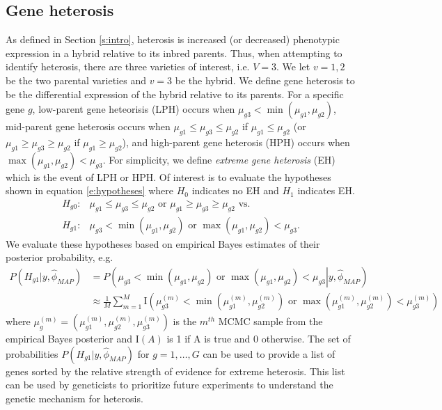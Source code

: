 \documentclass[useAMS,usenatbib,referee]{biom}
\begin{document}
\subsection{Gene heterosis}
\label{s:gene_heterosis}

As defined in Section \ref{s:intro}, heterosis is increased (or decreased) phenotypic expression in a hybrid relative to its inbred parents. Thus, when attempting to identify heterosis, there are three varieties of interest, i.e. $V=3$. We let $v=1,2$ be the two parental varieties and $v=3$ be the hybrid. We define gene heterosis to be the differential expression of the hybrid relative to its parents. For a specific gene $g$, low-parent gene heteorisis (LPH) occurs when $\mu_{g3}< \min(\mu_{g1},\mu_{g2})$, mid-parent gene heterosis occurs when $\mu_{g1}\le \mu_{g3}\le \mu_{g2}$ if $\mu_{g1}\le \mu_{g2}$ (or $\mu_{g1}\ge \mu_{g3}\ge \mu_{g2}$ if $\mu_{g1}\ge \mu_{g2}$), and high-parent gene heterosis (HPH) occurs when $\max(\mu_{g1},\mu_{g2}) < \mu_{g3}$. For simplicity, we define \emph{extreme gene heterosis} (EH) which is the event of LPH or HPH. Of interest is to evaluate the hypotheses shown in equation \eqref{e:hypotheses} where $H_0$ indicates no EH and $H_1$ indicates EH. 
\begin{align}
\label{e:hypotheses}
H_{g0}:&\mu_{g1}\le \mu_{g3}\le \mu_{g2} \mbox{ or } \mu_{g1}\ge \mu_{g3}\ge \mu_{g2} \mbox{\ \ vs.\ \ } \nonumber \\
H_{g1}:&\mu_{g3}< \min(\mu_{g1},\mu_{g2}) \mbox{ or } \max(\mu_{g1},\mu_{g2}) < \mu_{g3}.
\end{align}
We evaluate these hypotheses based on empirical Bayes estimates of their posterior probability, e.g. 
\begin{align}
P\left(H_{g1}|y, \hat{\phi}_{MAP}\right) &= P\left(\left.\mu_{g3}< \min(\mu_{g1},\mu_{g2}) \mbox{ or } \max(\mu_{g1},\mu_{g2}) < \mu_{g3}\right| y, \hat{\phi}_{MAP}\right) \nonumber \\
&\approx \frac{1}{M} \sum_{m=1}^M \mathrm{I}\left(\mu_{g3}^{(m)}< \min\left(\mu_{g1}^{(m)},\mu_{g2}^{(m)}\right) \mbox{ or } \max\left(\mu_{g1}^{(m)},\mu_{g2}^{(m)}\right) < \mu_{g3}^{(m)}\right) \label{e:probs}
\end{align}
where $\mu_g^{(m)} = \left(\mu_{g1}^{(m)},\mu_{g2}^{(m)},\mu_{g3}^{(m)}\right)$ is the $m^{th}$ MCMC sample from the empirical Bayes posterior and $\mathrm{I}(A)$ is 1 if A is true and 0 otherwise. The set of probabilities $P\left(H_{g1}|y, \hat{\phi}_{MAP}\right)$ for $g=1,\ldots,G$ can be used to provide a list of genes sorted by the relative strength of evidence for extreme heterosis. This list can be used by geneticists to prioritize future experiments to understand the genetic mechanism for heterosis.  
\end{document}
